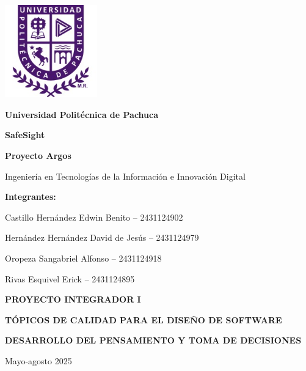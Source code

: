 \begin{titlepage}
    \centering

    \includegraphics[width=0.3\textwidth]{logo_upp.jpg}\par

    \vspace{1cm}
    {\Huge\bfseries Universidad Politécnica de Pachuca\par}
    \vspace{2cm}

    {\Large\bfseries SafeSight\par}
    \vspace{1cm}

    {\Huge\bfseries Proyecto Argos\par}
    \vspace{1.5cm}

    {\Large Ingeniería en Tecnologías de la Información e Innovación Digital\par}
    \vspace{1cm}

    {\large\bfseries Integrantes:\par}
    \vspace{0.5cm}
    {\large Castillo Hernández Edwin Benito -- 2431124902\par}
    {\large Hernández Hernández David de Jesús -- 2431124979\par}
    {\large Oropeza Sangabriel Alfonso -- 2431124918\par}
    {\large Rivas Esquivel Erick -- 2431124895\par}
    \vspace{0.5cm}

    {\large\bfseries PROYECTO INTEGRADOR I\par}
    {\large\bfseries TÓPICOS DE CALIDAD PARA EL DISEÑO DE SOFTWARE\par}
    {\large\bfseries DESARROLLO DEL PENSAMIENTO Y TOMA DE DECISIONES\par}
    
    \vspace{1cm}

    {\large Mayo-agosto 2025\par}
    \vfill

    \thispagestyle{empty}
\end{titlepage}





